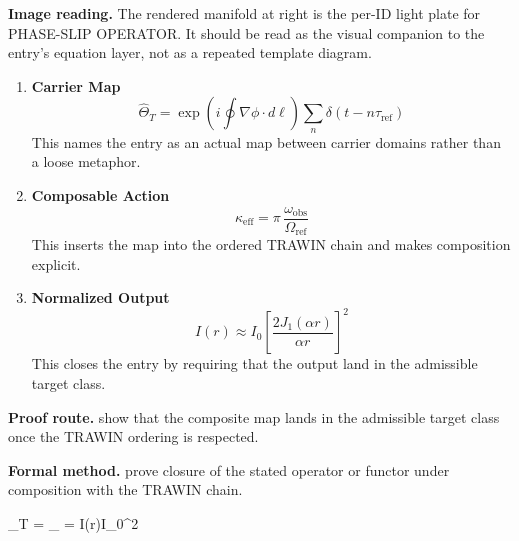 \begin{samepage}
\noindent\begin{minipage}[t]{0.45\linewidth}
\vspace{0pt}
\raggedright
\scriptsize\textbf{Image reading.} The rendered manifold at right is the per-ID light plate for PHASE-SLIP OPERATOR. It should be read as the visual companion to the entry's equation layer, not as a repeated template diagram.\par
\end{minipage}\hfill
\begin{minipage}[t]{0.53\linewidth}
\vspace*{-0.10in}
\raggedright
{}
\end{minipage}
\end{samepage}

\clearpage


\begin{enumerate}[leftmargin=1.6em,itemsep=9pt,topsep=6pt]
\item \textbf{Carrier Map}
\[
\widehat{\Theta}_{T}=
\exp\!\left(i\oint\nabla\phi\cdot d\ell\right)
\sum_n\delta(t-n\tau_{\mathrm{ref}})
\]
This names the entry as an actual map between carrier domains rather than a loose metaphor.

\item \textbf{Composable Action}
\[
\kappa_{\mathrm{eff}}=
\pi\,\frac{\omega_{\mathrm{obs}}}{\Omega_{\mathrm{ref}}}
\]
This inserts the map into the ordered TRAWIN chain and makes composition explicit.

\item \textbf{Normalized Output}
\[
I(r)\approx I_0\left[\frac{2J_1(\alpha r)}{\alpha r}\right]^2
\]
This closes the entry by requiring that the output land in the admissible target class.
\end{enumerate}

\textbf{Proof route.} show that the composite map lands in the admissible target class once the TRAWIN ordering is respected.

\textbf{Formal method.} prove closure of the stated operator or functor under composition with the TRAWIN chain.

\medskip
{}

\begin{tzpsnapshot}
\end{tzpsnapshot}

\tzpequationlinks
  {\widehat{\Theta}_{T} = \cdots}
  {\kappa_{} = \cdots}
  {I(r)\approx I_0^2}
